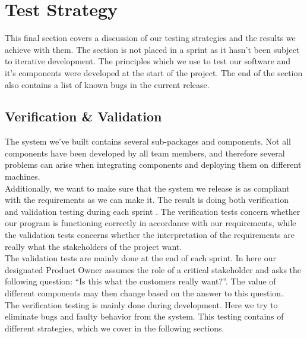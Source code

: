 \section{Test Strategy}
This final section covers a discussion of our testing strategies and the results we achieve with them. The section is not placed in a sprint as it hasn’t been subject to iterative development. The principles which we use to test our software and it’s components were developed at the start of the project. The end of the section also contains a list of known bugs in the current release.
\subsection{Verification \& Validation}
The system we’ve built contains several sub-packages and components. Not all components have been developed by all team members, and therefore several problems can arise when integrating components and deploying them on different machines. \\
Additionally, we want to make sure that the system we release is as compliant with the requirements as we can make it. The result is doing both verification and validation testing during each sprint \cite[p.~207]{se9}. The verification tests concern whether our program is functioning correctly in accordance with our requirements, while the validation tests concerns whether the interpretation of the requirements are really what the stakeholders of the project want. \\
The validation tests are mainly done at the end of each sprint. In here our designated Product Owner assumes the role of a critical stakeholder and asks the following question: “Is this what the customers really want?”. The value of different components may then change based on the answer to this question. \\
The verification testing is mainly done during development. Here we try to eliminate bugs and faulty behavior from the system. This testing contains of different strategies, which we cover in the following sections.
